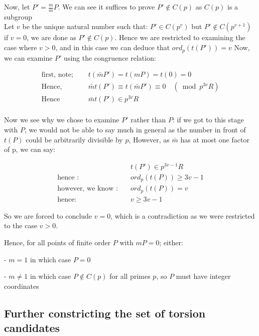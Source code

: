 \documentclass{article}
\begin{document}
Now, let $P' = \frac{m}{\bar{m}} P$. We can see it suffices to prove $P' \notin C(p)$ as $C(p)$ is a subgroup\\

Let $v$ be the unique natural number such that: $P' \in C(p^v)$ but $P' \notin C(p^{v+1})$ \\

if $v = 0$, we are done as $P' \notin C(p)$. Hence we are restricted to examining the case where $v > 0$, and in this case we can deduce that $ord_p(t(P')) = v$ Now, we can examine $P'$ using the congruence relation:

\begin{align*}
    \text{first, note; } \quad & t(\bar{m}P') = t(mP) = t(0) = 0 \\
    \text{Hence, } \quad & \bar{m}t(P') \equiv t(\bar{m}P') \equiv 0 \quad (\bmod{p^{3v}R}) \\
    \text{Hence } \quad & \bar{m}t(P') \in p^{3v}R \\
\end{align*}

Now we see why we chose to examine $P'$ rather than $P$: if we got to this stage with $P$, we would not be able to say much in general as the number in front of $t(P)$ could be arbitrarily divisible by $p$, However, as $\bar{m}$ has at most one factor of p, we can say:

\begin{align*}
    & t(P') \in p^{3v-1}R\\
    \text{hence :} \quad & ord_p(t(P)) \geq 3v - 1 \\
    \text{however, we know :} \quad & ord_p(t(P)) = v\\
    \text{hence: } \quad & v \geq 3v - 1
\end{align*}

So we are forced to conclude $v = 0$, which is a contradiction as we were restricted to the case $v > 0$.

Hence, for all points of finite order $P$ with $mP = 0$; either:

- $m = 1$ in which case $P = 0$

- $m \neq 1$ in which case $P \notin C(p)$ for all primes $p$, so $P$ must have integer coordinates

\subsection{Further constricting the set of torsion candidates}
\end{document}
